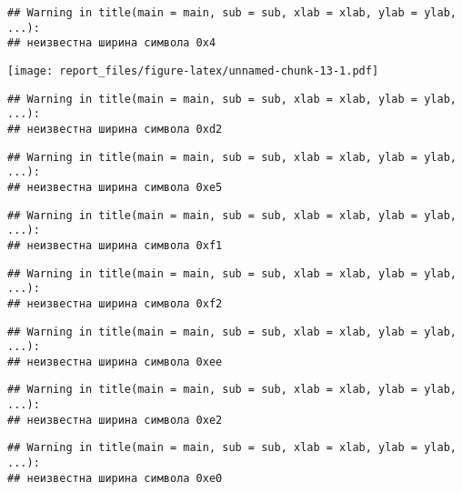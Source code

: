 \documentclass[
]{article}
\newenvironment{Shaded}{\begin{snugshade}}{\end{snugshade}}
\newcommand{\KeywordTok}[1]{\textcolor[rgb]{0.13,0.29,0.53}{\textbf{#1}}}
\newcommand{\NormalTok}[1]{#1}
\newcommand{\OperatorTok}[1]{\textcolor[rgb]{0.81,0.36,0.00}{\textbf{#1}}}
\newcommand{\StringTok}[1]{\textcolor[rgb]{0.31,0.60,0.02}{#1}}
\begin{document}
\begin{verbatim}
## Warning in title(main = main, sub = sub, xlab = xlab, ylab = ylab, ...):
## неизвестна ширина символа 0x4
\end{verbatim}

\texttt{[image: report\_files/figure-latex/unnamed-chunk-13-1.pdf]}

\begin{Shaded}
\end{Shaded}

\begin{verbatim}
## Warning in title(main = main, sub = sub, xlab = xlab, ylab = ylab, ...):
## неизвестна ширина символа 0xd2
\end{verbatim}

\begin{verbatim}
## Warning in title(main = main, sub = sub, xlab = xlab, ylab = ylab, ...):
## неизвестна ширина символа 0xe5
\end{verbatim}

\begin{verbatim}
## Warning in title(main = main, sub = sub, xlab = xlab, ylab = ylab, ...):
## неизвестна ширина символа 0xf1
\end{verbatim}

\begin{verbatim}
## Warning in title(main = main, sub = sub, xlab = xlab, ylab = ylab, ...):
## неизвестна ширина символа 0xf2
\end{verbatim}

\begin{verbatim}
## Warning in title(main = main, sub = sub, xlab = xlab, ylab = ylab, ...):
## неизвестна ширина символа 0xee
\end{verbatim}

\begin{verbatim}
## Warning in title(main = main, sub = sub, xlab = xlab, ylab = ylab, ...):
## неизвестна ширина символа 0xe2
\end{verbatim}

\begin{verbatim}
## Warning in title(main = main, sub = sub, xlab = xlab, ylab = ylab, ...):
## неизвестна ширина символа 0xe0
\end{verbatim}
\end{document}
